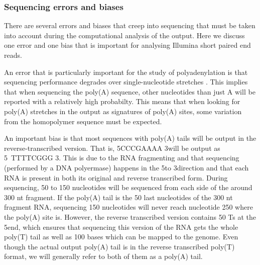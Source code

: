 \subsubsection{Sequencing errors and biases}
There are several errors and biases that creep into sequencing that must be
taken into account during the computational analysis of the output. Here we
discuss one error and one bias that is important for analysing Illumina short
paired end reads.

An error that is particularly important for the study of polyadenylation is
that sequencing performance degrades over single-nucleotide stretches
\cite{minoche_evaluation_2011}. This implies that when sequencing the poly(A)
sequence, other nucleotides than just A will be reported with a relatively high
probabilty. This means that when looking for poly(A) stretches in the output as
signatures of poly(A) sites, some variation from the homopolymer sequence must
be expected.

An important bias is that most sequences with poly(A) tails will be output in
the reverse-transcribed version. That is, 5\p CCCGAAAA 3\p will be output as 5\
TTTTCGGG 3\p. This is due to the RNA fragmenting and that sequencing
(performed by a DNA polyermase) happens in the 5\p to 3\p direction and that
each RNA is present in both its original and reverse transcribed form. During
sequencing, 50 to 150 nucleotides will be sequenced from each side of the around
300 nt fragment. If the poly(A) tail is the 50 last nucleotides of the 300 nt
fragment RNA, sequencing 150 nucleotides will never reach nucleotide 250 where
the poly(A) site is. However, the reverse transcribed version contains 50 Ts at
the 5\p end, which ensures that sequencing this version of the RNA gets the
whole poly(T) tail as well as 100 bases which can be mapped to the genome.
Even though the actual output poly(A) tail is in the reverse transcribed
poly(T) format, we will generally refer to both of them as a poly(A) tail.

